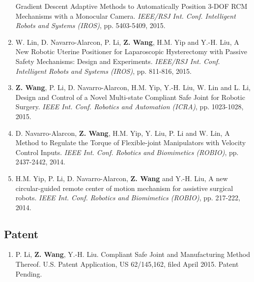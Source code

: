 \documentclass[10pt,letterpaper]{article}
\begin{document}
\begin{enumerate}
  Gradient Descent Adaptive Methods to Automatically Position 3-DOF RCM Mechanisms with a Monocular Camera.
  \textit{{IEEE/RSJ} Int. Conf. Intelligent Robots and Systems (IROS)}, pp. 5403-5409, 2015.
\item W. Lin, D. Navarro-Alarcon, P. Li, \textbf{Z. Wang}, H.M. Yip and Y.-H. Liu,
  A New Robotic Uterine Positioner for Laparoscopic Hysterectomy with Passive Safety Mechanisms: Design and Experiments.
  \textit{{IEEE/RSJ} Int. Conf. Intelligent Robots and Systems (IROS)}, pp. 811-816, 2015.
\item \textbf{Z. Wang}, P. Li, D. Navarro-Alarcon, H.M. Yip, Y.-H. Liu, W. Lin and L. Li,
  Design and Control of a Novel Multi-state Compliant Safe Joint for Robotic Surgery.
  \textit{{IEEE} Int. Conf. Robotics and Automation (ICRA)}, pp. 1023-1028, 2015.
\item D. Navarro-Alarcon, \textbf{Z. Wang}, H.M. Yip, Y. Liu, P. Li and W. Lin,
  A Method to Regulate the Torque of Flexible-joint Manipulators with Velocity Control Inputs.
  \textit{{IEEE} Int. Conf. Robotics and Biomimetics (ROBIO)}, pp. 2437-2442, 2014.
\item H.M. Yip, P. Li, D. Navarro-Alarcon, \textbf{Z. Wang} and Y.-H. Liu,
  A new circular-guided remote center of motion mechanism for assistive surgical robots.
  \textit{{IEEE} Int. Conf. Robotics and Biomimetics (ROBIO)}, pp. 217-222, 2014.
\end{enumerate}

\subsection*{Patent}
\begin{enumerate}
\item P. Li, \textbf{Z. Wang}, Y.-H. Liu.
  Compliant Safe Joint and Manufacturing Method Thereof.
  U.S. Patent Application, US 62/145,162, filed April 2015. Patent Pending.
\end{enumerate}

\end{document}
